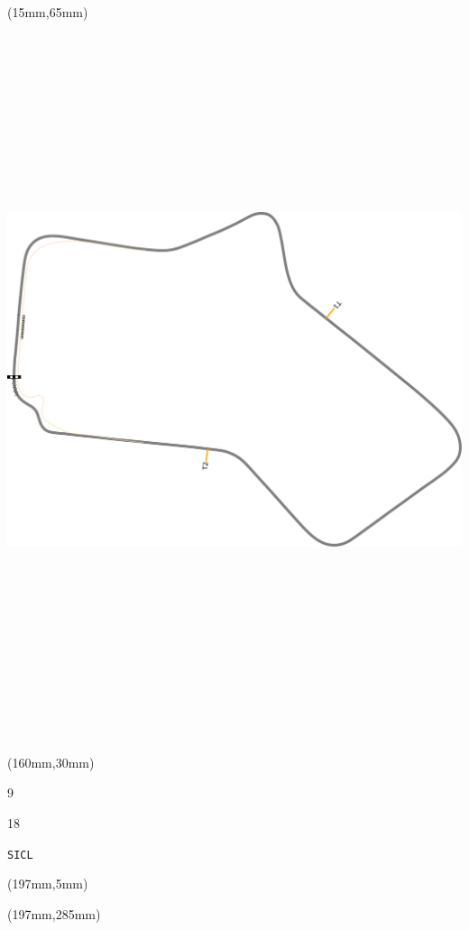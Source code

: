 \begin{textblock*}{185mm}(15mm,65mm)%
\centering
\mbox{\includegraphics[width=185mm,height=210mm,keepaspectratio]{PT/SICL.pdf}}
\end{textblock*}
\begin{textblock*}{40mm}(160mm,30mm)%
\Large
\par{} 
\par9 
\par18 
\par\hfill\tiny\tt SICL\\
\end{textblock*}
\begin{textblock*}{20mm}(197mm,5mm)%
\fbox{\thepage}
\label{SICL}
\end{textblock*}
\begin{textblock*}{20mm}(197mm,285mm)%
\fbox{\thepage}
\end{textblock*}

